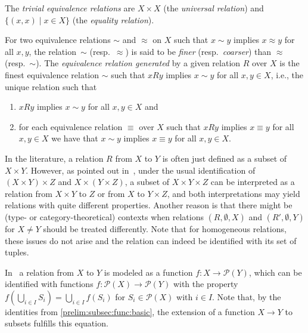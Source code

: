 The \emph{trivial equivalence relations} 
are $X \times X$ (the \emph{universal relation}) 
and $\{ (x,x) \mid x \in X\}$ (the \emph{equality relation}).

For two equivalence relations $\sim$ and $\approx$ 
on $X$ such that $x \sim y$ implies $x \approx y$ for all $x,y$, the relation~$\sim$ (resp.~$\approx$)
is said to be \emph{finer} (resp.~\emph{coarser}) 
than $\approx$ (resp.~$\sim$).
The \emph{equivalence relation generated}
by a given relation $R$ over $X$
is the finest equivalence relation $\sim$
such that $xRy$ implies $x \sim y$ for all $x,y \in X$, i.e.,
the unique relation such that
\begin{enumerate}
	\item $xRy$ implies $x \sim y$ for all $x,y \in X$ and
	
	\item for each equivalence relation $\equiv$ over $X$ such that 
	$xRy$ implies $x \equiv y$ for all $x,y \in X$ we have
	that $x \sim y$ implies $x \equiv y$ for all $x,y \in X$.
\end{enumerate}

\begin{remark} \label{prelim:rel:rem:def}
	In the literature, a relation $R$ from $X$ to $Y$ is often just defined
	as a subset of $X \times Y$. However, as pointed out in~\cite[p.~2]{Eilenberg1974},
	under the usual identification of $(X \times Y) \times Z$
	and $X \times (Y \times Z)$,
	a subset of $X \times Y \times Z$
	can be interpreted as a relation 
	from $X \times Y$ to $Z$
	or from $X$ to $Y \times Z$,
	and both interpretations may yield
	relations with quite different properties.	
	Another reason is that there might be (type- or category-theoretical) contexts
	when relations $(R, \emptyset, X)$
	and $(R', \emptyset, Y)$ for $X \ne Y$
	should be treated differently.
	Note that for homogeneous relations,
	these issues do not arise and the relation can indeed
	be identified with its set of tuples.
\end{remark}

\begin{remark}
	In~\cite{Eilenberg1974}	
	a relation from $X$ to $Y$ 
	is modeled as a function $f \colon X \to \mathcal P(Y)$,
	which can be identified with functions $f \colon \mathcal P(X) \to \mathcal P(Y)$
	with the property $f(\bigcup_{i\in I} S_i) = \bigcup_{i \in I} f(S_i)$
	for $S_i \in \mathcal P(X)$ with $i \in I$.	
	Note that, by the identities from \cref{prelim:subsec:func:basic},
	the extension of a function $X \to Y$ to subsets
	fulfills this equation.
\end{remark}